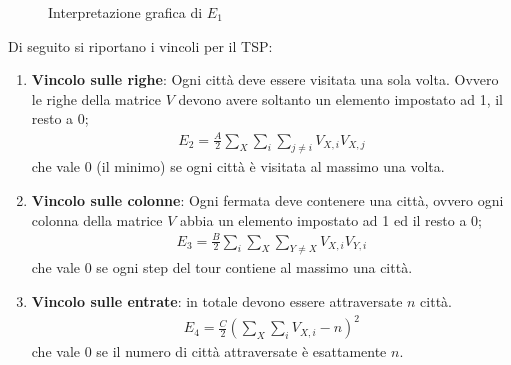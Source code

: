 \begin{figure}[h!]
	\centering
    
	\qquad
	\caption{Interpretazione grafica di $E_1$}
\end{figure}


\newpage


Di seguito si riportano i vincoli per il TSP:

\begin{enumerate}
	\item \textbf{Vincolo sulle righe}: Ogni città deve essere visitata una sola volta. Ovvero le righe della matrice $V$ devono avere soltanto un elemento impostato ad 1, il resto a 0;
	\begin{align*}
		E_2 = \frac{A}{2} \sum_X \sum_i \sum_{j \neq i} V_{X,i} V_{X,j}
	\end{align*}
	che vale 0 (il minimo) se ogni città è visitata al massimo una volta.
	\item \textbf{Vincolo sulle colonne}: Ogni fermata deve contenere una città, ovvero ogni colonna della matrice $V$ abbia un elemento impostato ad 1 ed il resto a 0;
	\begin{align*}
		E_3 = \frac{B}{2} \sum_i \sum_X \sum_{Y \neq X} V_{X,i} V_{Y,i}
	\end{align*}
	che vale 0 se ogni step del tour contiene al massimo una città.
	\item \textbf{Vincolo sulle entrate}: in totale devono essere attraversate $n$ città.
	\begin{align*}
		E_4 = \frac{C}{2}\left(\sum_X \sum_i V_{X,i} - n \right)^2
	\end{align*}
	che vale 0 se il numero di città attraversate è esattamente $n$.
\end{enumerate}

